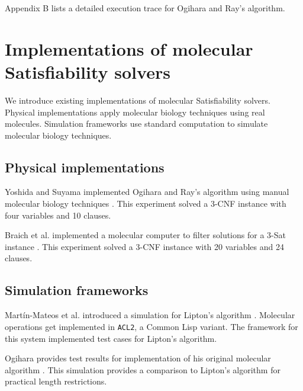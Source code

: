 Appendix B lists a detailed execution trace for Ogihara and Ray's algorithm.

\section{Implementations of molecular {\sc Satisfiability} solvers}

We introduce existing implementations of molecular {\sc Satisfiability} solvers.  Physical implementations apply molecular biology techniques using real molecules.  Simulation frameworks use standard computation to simulate molecular biology techniques.

	\subsection{Physical implementations}
	

Yoshida and Suyama implemented Ogihara and Ray's algorithm using manual molecular biology techniques \cite{dnaBasedImplemetation_Yoshida2000}.  This experiment solved a 3-CNF instance with four variables and 10 clauses.

Braich et al. implemented a molecular computer to filter solutions for a 3-{\sc Sat} instance \cite{Braich02solutionof}.  This experiment solved a 3-CNF instance with 20 variables and 24 clauses.
	
	\subsection{Simulation frameworks}

Martín-Mateos et al. introduced a simulation for Lipton's algorithm \cite{MartinMateos02molecularcomputation}.   Molecular operations get implemented in \texttt{ACL2}, a Common Lisp variant.  The framework for this system implemented test cases for Lipton's algorithm.

Ogihara provides test results for implementation of his original molecular algorithm \cite{Ogihara:1996:BFS:898228}.  This simulation provides a comparison to Lipton's algorithm for practical length restrictions.
